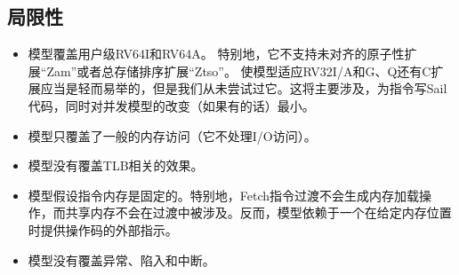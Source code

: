 \subsection{局限性}\label{sec:omm:limitations}
\begin{itemize}
\item 模型覆盖用户级RV64I和RV64A。
特别地，它不支持未对齐的原子性扩展“Zam”或者总存储排序扩展“Ztso”。
使模型适应RV32I/A和G、Q还有C扩展应当是轻而易举的，但是我们从未尝试过它。这将主要涉及，为指令写Sail代码，同时对并发模型的改变（如果有的话）最小。
\item 模型只覆盖了一般的内存访问（它不处理I/O访问）。  %
\item 模型没有覆盖TLB相关的效果。  %
\item 模型假设指令内存是固定的。特别地，Fetch指令过渡不会生成内存加载操作，而共享内存不会在过渡中被涉及。反而，模型依赖于一个在给定内存位置时提供操作码的外部指示。 %
\item 模型没有覆盖异常、陷入和中断。 %
\end{itemize}

